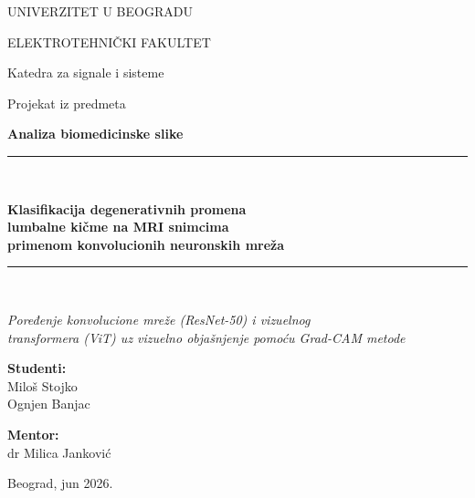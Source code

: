 \documentclass[12pt,a4paper]{article}
\begin{document}
\begin{titlepage}
\centering
{\large UNIVERZITET U BEOGRADU\par}
{\large ELEKTROTEHNIČKI FAKULTET\par}
\vspace{0.4cm}
{\normalsize Katedra za signale i sisteme\par}
\vspace{2.5cm}

{\normalsize Projekat iz predmeta\par}
{\large\bfseries Analiza biomedicinske slike\par}
\vspace{2.0cm}

\rule{\linewidth}{0.5pt}\\[0.5cm]
{\LARGE\bfseries Klasifikacija degenerativnih promena\\[0.2cm]
lumbalne kičme na MRI snimcima\\[0.2cm]
primenom konvolucionih neuronskih mreža\par}
\vspace{0.4cm}
\rule{\linewidth}{0.5pt}\\[0.6cm]
{\large\itshape Poređenje konvolucione mreže (ResNet-50) i vizuelnog\\
transformera (ViT) uz vizuelno objašnjenje pomoću Grad-CAM metode\par}

\vfill

\begin{minipage}{0.45\textwidth}
\begin{flushleft}
\large
\textbf{Studenti:}\\
Miloš Stojko\\
Ognjen Banjac
\end{flushleft}
\end{minipage}
\hfill
\begin{minipage}{0.45\textwidth}
\begin{flushright}
\large
\textbf{Mentor:}\\
\mbox{}dr Milica Janković
\end{flushright}
\end{minipage}

\vspace{1.5cm}
{\normalsize Beograd, jun 2026.\par}
\end{titlepage}
\end{document}
